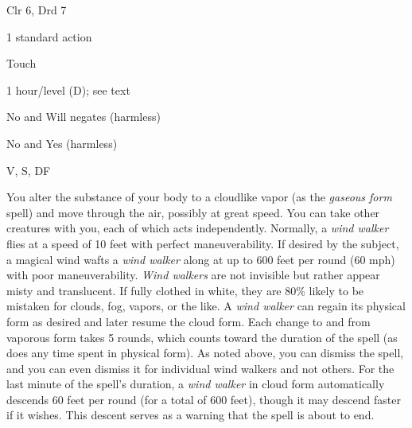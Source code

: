
\begin{description*}
\item[Level:] Clr 6, Drd 7
\item[Casting Time:] 1 standard action
\item[Range:] Touch
\item[Duration:] 1 hour/level (D); see text
\item[Saving Throw:] No and Will negates (harmless)
\item[Spell Resistance:] No and Yes (harmless)
\item[Components:] V, S, DF
\end{description*}

You alter the substance of your body to a cloudlike vapor (as the \textit{gaseous
form} spell) and move through the air, possibly at great speed. You can take other
creatures with you, each of which acts independently.
Normally, a \textit{wind walker} flies at a speed of 10 feet with perfect maneuverability.
If desired by the subject, a magical wind wafts a \textit{wind walker} along at
up to 600 feet per round (60 mph) with poor maneuverability. \textit{Wind walkers
}are not invisible but rather appear misty and translucent. If fully clothed in
white, they are 80\% likely to be mistaken for clouds, fog, vapors, or the like.
A \textit{wind walker} can regain its physical form as desired and later resume
the cloud form. Each change to and from vaporous form takes 5 rounds, which counts
toward the duration of the spell (as does any time spent in physical form). As
noted above, you can dismiss the spell, and you can even dismiss it for individual
wind walkers and not others.
For the last minute of the spell's duration, a \textit{wind walker} in cloud form
automatically descends 60 feet per round (for a total of 600 feet), though it may
descend faster if it wishes. This descent serves as a warning that the spell is
about to end.